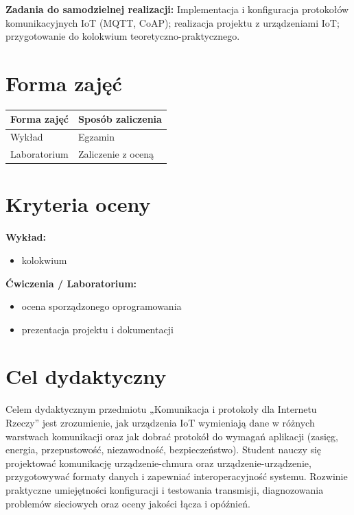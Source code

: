 \documentclass[12pt, a4paper]{article}
\newcommand{\thdrule}{\noalign{\global\setlength{\extrarowheight}{0pt}}}
\newcommand{\thdend}{\noalign{\global\setlength{\extrarowheight}{3pt}}}
\begin{document}
\vspace{4pt}
\noindent\textbf{Zadania do samodzielnej realizacji:} Implementacja i konfiguracja protokołów komunikacyjnych IoT (MQTT, CoAP); realizacja projektu z urządzeniami IoT; przygotowanie do kolokwium teoretyczno-praktycznego.

\section{Forma zajęć}

\begin{center}
{\scriptsize
\begin{tabular}{m{5cm}m{8cm}}
\thdrule\toprule
\rowcolor{pjatkRed} {\color{white}\textbf{Forma zajęć}} & {\color{white}\textbf{Sposób zaliczenia}} \\
\midrule\thdend
  \rowcolor{tableRowLight} Wykład & Egzamin \\
  \rowcolor{tableRowAlt} Laboratorium & Zaliczenie z oceną \\
\bottomrule
\end{tabular}}
\end{center}

\section{Kryteria oceny}

\textbf{Wykład:}
\begin{itemize}
  \item kolokwium
\end{itemize}
\vspace{4pt}
\textbf{Ćwiczenia / Laboratorium:}
\begin{itemize}
  \item ocena sporządzonego oprogramowania
  \item prezentacja projektu i dokumentacji
\end{itemize}


\section{Cel dydaktyczny}

Celem dydaktycznym przedmiotu „Komunikacja i protokoły dla Internetu Rzeczy” jest zrozumienie, jak urządzenia IoT wymieniają dane w różnych warstwach komunikacji oraz jak dobrać protokół do wymagań aplikacji (zasięg, energia, przepustowość, niezawodność, bezpieczeństwo). Student nauczy się projektować komunikację urządzenie-chmura oraz urządzenie-urządzenie, przygotowywać formaty danych i zapewniać interoperacyjność systemu. Rozwinie praktyczne umiejętności konfiguracji i testowania transmisji, diagnozowania problemów sieciowych oraz oceny jakości łącza i opóźnień.
\end{document}
